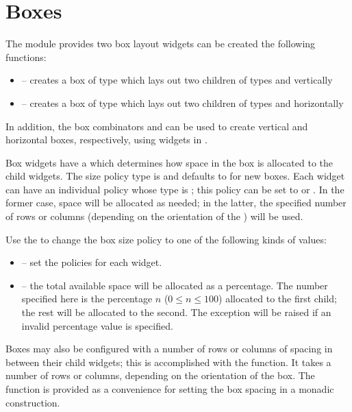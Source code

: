 \section{Boxes}

The  module provides two box layout widgets can be created the
following functions:

\begin{itemize}
\item {} -- creates a box of type  which
  lays out two children of types  and 
  vertically
\item {} -- creates a box of type  which
  lays out two children of types  and 
  horizontally
\end{itemize}

In addition, the box combinators \fw{<-->} and \fw{<++>} can be used
to create vertical and horizontal boxes, respectively, using widgets
in .

Box widgets have a  which determines how space
in the box is allocated to the child widgets.  The size policy type is
 and defaults to  for
new boxes.  Each widget can have an individual policy whose type is
; this policy can be set to  or
.  In the former case, space will be allocated as
needed; in the latter, the specified number of rows or columns
(depending on the orientation of the ) will be used.

Use the  to change the box size policy to
one of the following kinds of values:

\begin{itemize}
\item {} -- set the
  policies for each widget.
\item {} -- the total available space will be
  allocated as a percentage.  The number specified here is the
  percentage $n$ ($0 \le n \le 100$) allocated to the first child; the
  rest will be allocated to the second.  The  exception
  will be raised if an invalid percentage value is specified.
\end{itemize}

Boxes may also be configured with a number of rows or columns of
spacing in between their child widgets; this is accomplished with the
 function.  It takes a number of rows or columns,
depending on the orientation of the box.  The function
 is provided as a convenience for setting the box
spacing in a monadic construction.

